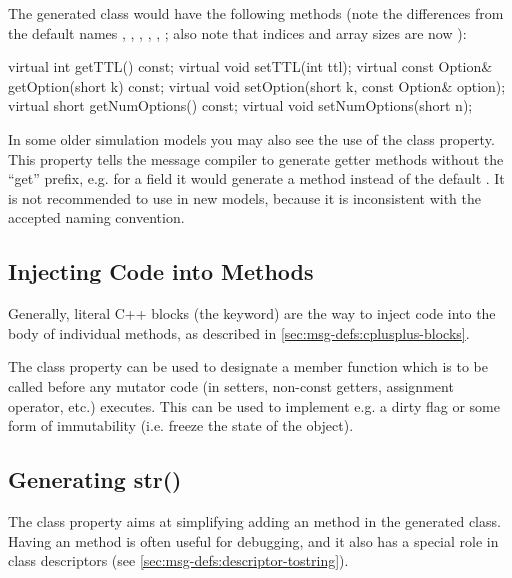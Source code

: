 The generated class would have the following methods (note the differences
from the default names , , ,
, , ;
also note that indices and array sizes are now ):

\begin{cpp}
virtual int getTTL() const;
virtual void setTTL(int ttl);
virtual const Option& getOption(short k) const;
virtual void setOption(short k, const Option& option);
virtual short getNumOptions() const;
virtual void setNumOptions(short n);
\end{cpp}

In some older simulation models you may also see the use of the
 class property. This property tells the message
compiler to generate getter methods without the ``get'' prefix, e.g. for a
 field it would generate a  method
instead of the default . It is not recommended to
use  in new models, because it is inconsistent with the
accepted naming convention.



\subsection{Injecting Code into Methods}
\label{sec:msg-defs:injecting-code-into-methods}

Generally, literal C++ blocks (the  keyword) are the way to
inject code into the body of individual methods, as described in
\ref{sec:msg-defs:cplusplus-blocks}.

The  class property can be used to designate a member function
which is to be called before any mutator code (in setters, non-const getters,
assignment operator, etc.) executes. This can be used to implement e.g. a dirty
flag or some form of immutability (i.e. freeze the state of the object).


\subsection{Generating str()}
\label{sec:msg-defs:generating-str-method}

The  class property aims at simplifying adding an 
method in the generated class. Having an  method is often useful
for debugging, and it also has a special role in class descriptors (see
\ref{sec:msg-defs:descriptor-tostring}).

